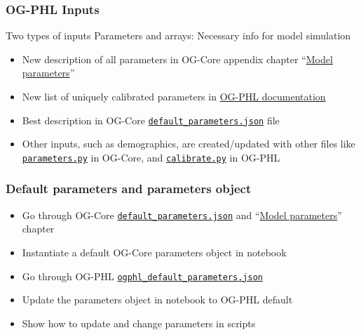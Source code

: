 \documentclass{beamer}
\begin{document}
  \begin{frame}
    \frametitle{OG-PHL Inputs}
    \begin{block}{Two types of inputs}
      Parameters and arrays: Necessary info for model simulation
    \end{block}
    \vspace{2mm}
    \begin{itemize}
      \item New description of all parameters in OG-Core appendix chapter ``\href{https://pslmodels.github.io/OG-Core/content/intro/parameters.html}{Model parameters}''
      \vspace{2mm}
      \item New list of uniquely calibrated parameters in \href{https://eapd-drb.github.io/OG-PHL/content/calibration/exogenous_parameters.html}{OG-PHL documentation}
      \vspace{2mm}
      \item Best description in OG-Core \href{https://github.com/PSLmodels/OG-Core/blob/master/ogcore/default_parameters.json}{\texttt{default\_parameters.json}} file
      \vspace{2mm}
      \item Other inputs, such as demographics, are created/updated with other files like \href{https://github.com/PSLmodels/OG-Core/blob/master/ogcore/parameters.py}{\texttt{parameters.py}} in OG-Core, and \href{https://github.com/EAPD-DRB/OG-PHL/blob/main/ogeth/calibrate.py}{\texttt{calibrate.py}} in OG-PHL
    \end{itemize}
  \end{frame}

  \begin{frame}
    \frametitle{Default parameters and parameters object}
    \begin{itemize}
      \item Go through OG-Core \href{https://github.com/PSLmodels/OG-Core/blob/master/ogcore/default_parameters.json}{\texttt{default\_parameters.json}} and ``\href{https://pslmodels.github.io/OG-Core/content/intro/parameters.html}{Model parameters}'' chapter
      \vspace{3mm}
      \item Instantiate a default OG-Core parameters object in notebook
      \vspace{3mm}
      \item Go through OG-PHL \href{https://github.com/EAPD-DRB/OG-PHL/blob/main/ogeth/ogphl_default_parameters.json}{\texttt{ogphl\_default\_parameters.json}}
      \vspace{3mm}
      \item Update the parameters object in notebook to OG-PHL default
      \vspace{3mm}
      \item Show how to update and change parameters in scripts
    \end{itemize}
  \end{frame}
\end{document}
